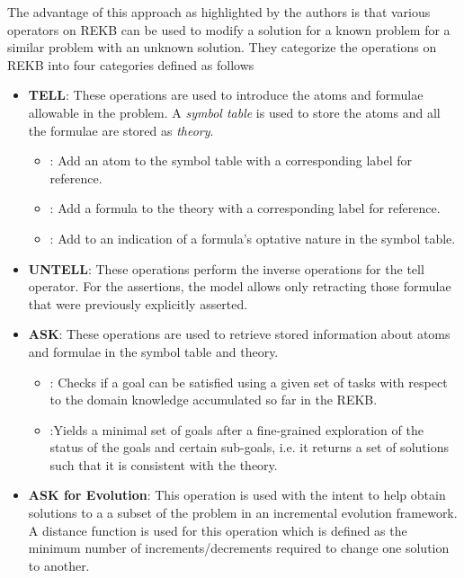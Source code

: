 The advantage of this approach as highlighted by the authors is that various operators on REKB can be used to modify a solution for a known problem for a similar problem with an unknown solution. They categorize the operations on REKB into four categories defined as follows
\begin{itemize}
    \item \textbf{TELL}: These operations are used to introduce the atoms and formulae allowable in the problem. A \textit{symbol table} is used to store the atoms and all the formulae are stored as \textit{theory}.
    \begin{itemize}
        \item {}: Add an atom to the symbol table with a corresponding label for reference.
        \item {}: Add a formula to the theory with a corresponding label for reference.
        \item {}: Add to an indication of a formula's optative nature in the symbol table.
    \end{itemize}
    \item \textbf{UNTELL}: These operations perform the inverse operations for the tell operator. For the assertions, the model allows only retracting those formulae that were previously explicitly asserted.
    \item \textbf{ASK}: These operations are used to retrieve stored information about atoms and formulae in the symbol table and theory.
    \begin{itemize}
        \item {}: Checks if a goal can be satisfied using a given set of tasks with respect to the domain knowledge accumulated so far in the REKB.
        \item {}:Yields a minimal set of goals after a fine-grained exploration of the status of the goals and certain sub-goals, i.e. it returns a set of solutions such that it is consistent with the theory.
    \end{itemize}
    \item \textbf{ASK for Evolution}: This operation is used with the intent to help obtain solutions to a a subset of the problem in an incremental evolution framework. A distance function is used for this operation which is defined as the minimum number of increments/decrements required to change one solution to another.
\end{itemize}

